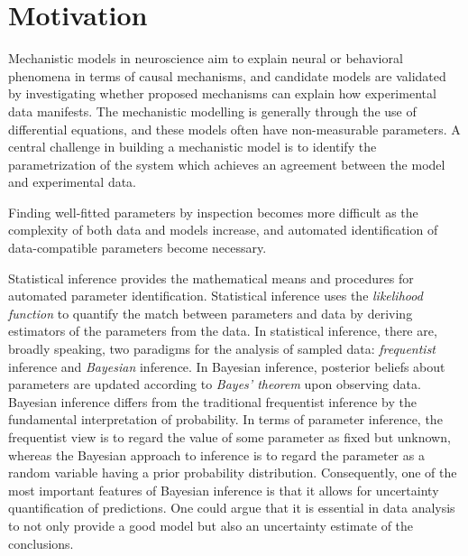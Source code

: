 


\section{Motivation}\label{sec:Motivation}

Mechanistic models in neuroscience aim to explain neural or behavioral phenomena in terms of causal mechanisms, and candidate models are validated by investigating whether proposed mechanisms can explain how experimental data manifests. The mechanistic modelling is generally through the use of differential equations, and these models often have non-measurable parameters. A central challenge in building a mechanistic model is to identify the parametrization of the system which achieves an agreement between the model and experimental data. 

Finding well-fitted parameters by inspection becomes more difficult as the complexity of both data and models increase, and automated identification of data-compatible parameters become necessary. 

Statistical inference provides the mathematical means and procedures for automated parameter identification.  Statistical inference uses the \textit{likelihood function} to quantify the match between parameters and data by deriving estimators of the parameters from the data. In statistical inference, there are, broadly speaking, two paradigms for the analysis of sampled data: \textit{frequentist} inference and \textit{Bayesian} inference. In Bayesian inference, posterior beliefs about parameters are updated according to \textit{Bayes' theorem} upon observing data. Bayesian inference differs from the traditional frequentist inference by the fundamental interpretation of probability. In terms of parameter inference, the frequentist view is to regard the value of some parameter as fixed but unknown, whereas the Bayesian approach to inference is to regard the parameter as a random variable having a prior probability distribution. Consequently, one of the most important features of Bayesian inference is that it allows for uncertainty quantification of predictions. One could argue that it is essential in data analysis to not only provide a good model but also an uncertainty estimate of the conclusions. 

